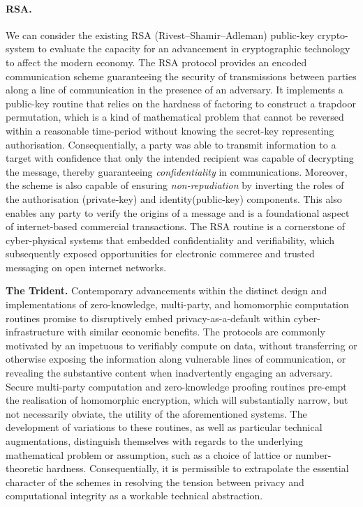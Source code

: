 \documentclass[twocolumn]{scrartcl}
\begin{document}
\paragraph{RSA.} We can consider the existing RSA (Rivest–Shamir–Adleman) public-key crypto-system to evaluate the capacity for an advancement in cryptographic technology to affect the modern economy. The RSA protocol provides an encoded communication scheme guaranteeing the security of transmissions between parties along a line of communication in the presence of an adversary. It implements a public-key routine that relies on the hardness of factoring to construct a trapdoor permutation, which is a kind of mathematical problem that cannot be reversed within a reasonable time-period without knowing the secret-key representing authorisation. Consequentially, a party was able to transmit information to a target with confidence that only the intended recipient was capable of decrypting the message, thereby guaranteeing \textit{confidentiality} in communications. Moreover, the scheme is also capable of ensuring \textit{non-repudiation} by inverting the roles of the authorisation (private-key) and identity(public-key) components. This also enables any party to verify the origins of a message and is a foundational aspect of internet-based commercial transactions. The RSA routine is a cornerstone of cyber-physical systems that embedded confidentiality and verifiability, which subsequently exposed opportunities for electronic commerce and trusted messaging on open internet networks.

\textbf{The Trident.} Contemporary advancements within the distinct design and implementations of zero-knowledge, multi-party, and homomorphic computation routines promise to disruptively embed privacy-as-a-default within cyber-infrastructure with similar economic benefits. The protocols are commonly motivated by an impetuous to verifiably compute on data, without transferring or otherwise exposing the information along vulnerable lines of communication, or revealing the substantive content when inadvertently engaging an adversary. Secure multi-party computation and zero-knowledge proofing routines pre-empt the realisation of homomorphic encryption, which will substantially narrow, but not necessarily obviate, the utility of the aforementioned systems. The development of variations to these routines, as well as particular technical augmentations, distinguish themselves with regards to the underlying mathematical problem or assumption, such as a choice of lattice or number-theoretic hardness. Consequentially, it is permissible to extrapolate the essential character of the schemes in resolving the tension between privacy and computational integrity as a workable technical abstraction.
\end{document}
